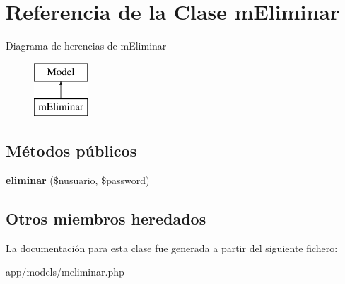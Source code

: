 \hypertarget{classm_eliminar}{}\section{Referencia de la Clase m\+Eliminar}
\label{classm_eliminar}
Diagrama de herencias de m\+Eliminar\begin{figure}[H]
\begin{center}
\leavevmode
\includegraphics[height=2.000000cm]{classm_eliminar}
\end{center}
\end{figure}
\subsection*{Métodos públicos}
\begin{DoxyCompactItemize}
\item 
\hypertarget{classm_eliminar_ab934c86dd926a71481946464ce83c580}{}{\bfseries eliminar} (\$nusuario, \$password)\label{classm_eliminar_ab934c86dd926a71481946464ce83c580}

\end{DoxyCompactItemize}
\subsection*{Otros miembros heredados}


La documentación para esta clase fue generada a partir del siguiente fichero\+:\begin{DoxyCompactItemize}
\item 
app/models/meliminar.\+php\end{DoxyCompactItemize}
